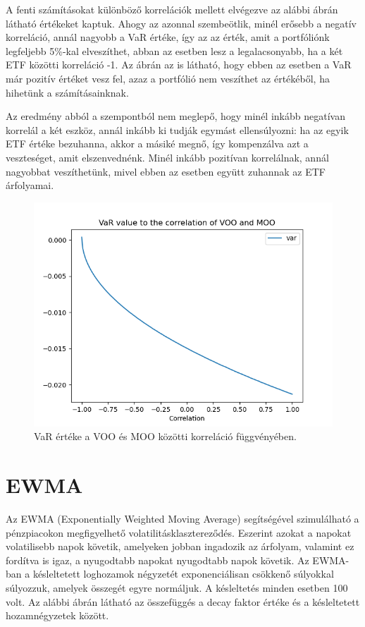 \documentclass[12pt]{article}
\begin{document}
A fenti számításokat különböző korrelációk mellett elvégezve az alábbi ábrán látható értékeket kaptuk. Ahogy az azonnal szembeötlik, minél erősebb a negatív korreláció, annál nagyobb a VaR értéke, így az az érték, amit a portfóliónk legfeljebb 5\%-kal elveszíthet, abban az esetben lesz a legalacsonyabb, ha a két ETF közötti korreláció -1. Az ábrán az is látható, hogy ebben az esetben a VaR már pozitív értéket vesz fel, azaz a portfólió nem veszíthet az értékéből, ha hihetünk a számításainknak.

Az eredmény abból a szempontból nem meglepő, hogy minél inkább negatívan korrelál a két eszköz, annál inkább ki tudják egymást ellensúlyozni: ha az egyik ETF értéke bezuhanna, akkor a másiké megnő, így kompenzálva azt a veszteséget, amit elszenvednénk. Minél inkább pozitívan korrelálnak, annál nagyobbat veszíthetünk, mivel ebben az esetben együtt zuhannak az ETF árfolyamai.

\begin{figure}[H]
	\centering
	\includegraphics[scale=0.9]{sim_var}
	\caption{VaR értéke a VOO és MOO közötti korreláció függvényében.}
\end{figure}


\section{EWMA}

Az EWMA (Exponentially Weighted Moving Average) segítségével szimulálható a pénzpiacokon megfigyelhető volatilitásklasztereződés. Eszerint azokat a napokat volatilisebb napok követik, amelyeken jobban ingadozik az árfolyam, valamint ez fordítva is igaz, a nyugodtabb napokat nyugodtabb napok követik. Az EWMA-ban a késleltetett loghozamok négyzetét exponenciálisan csökkenő súlyokkal súlyozzuk, amelyek összegét egyre normáljuk. A késleltetés minden esetben 100 volt. Az alábbi ábrán látható az összefüggés a decay faktor értéke és a késleltetett hozamnégyzetek között. 
\end{document}
